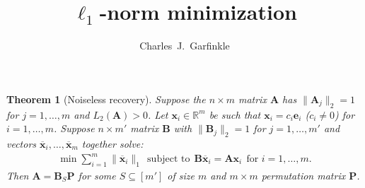 \documentclass[journal, onecolumn]{IEEEtran}
\newtheorem{theorem}{Theorem}
\begin{document}
\title{$\ell_1$-norm minimization}
\author{Charles~J.~Garfinkle}

\maketitle


\begin{theorem}[Noiseless recovery]
Suppose the $n \times m$ matrix $\mathbf{A}$ has $\|\mathbf{A}_j\|_2 = 1$ for $j = 1, \ldots, m$ and $L_2(\mathbf{A}) > 0$. Let $\mathbf{x}_i \in \mathbb{R}^m$ be such that $\mathbf{x}_i = c_i \mathbf{e}_i$ ($c_i \neq 0$) for $i = 1, \ldots, m$. Suppose $n \times m'$ matrix $\mathbf{B}$ with $\|\mathbf{B}_j\|_2 = 1$ for $j = 1, \ldots, m'$ and vectors $\mathbf{\overline x}_i, \ldots, \mathbf{\overline x}_m$ together solve:
\begin{align}\label{minsum}
\min \sum_{i = 1}^m \|\mathbf{\overline x}_i\|_1 \ \
\text{subject to} \ \ \mathbf{B}\mathbf{\overline x}_i = \mathbf{Ax}_i \ \ \text{for $i = 1, \ldots, m$}.
\end{align}
Then $\mathbf{A} = \mathbf{B}_S \mathbf{P}$ for some $S \subseteq [m']$ of size $m$ and $m \times m$ permutation matrix $\mathbf{P}$. 
\end{theorem}
\end{document}
